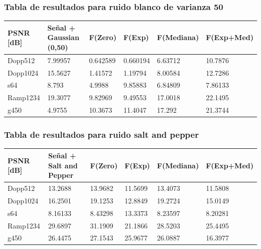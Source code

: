\subsubsection{Tabla de resultados para ruido blanco de varianza 50}

\begin{table}[H]
        \begin{tabular}{|l|lllll|}
                \hline
                \textbf{PSNR [dB]} & Se\~nal + Gaussian (0,50) & F(Zero) & F(Exp) & F(Mediana) & F(Exp+Med) \\ \hline
                    Dopp512 		& 7.99957				 & 0.642589 & 0.660194 & 6.63712 & 10.7876\\
                    Dopp1024 & 15.5627 							& 1.41572 & 1.19794 & 8.00584 &  12.7286   \\
                    s64 & 8.793 								& 4.9988 & 9.85883 &  6.84809  & 7.86133\\
                    Ramp1234	& 19.3077 						& 9.82969 & 9.49553 & 17.0018 & 22.1495 \\
                    g450 	& 4.9755 							& 10.3673 & 11.4047 & 17.292   &  21.3744\\ \hline
                    \end{tabular}
                \end{table}



\subsubsection{Tabla de resultados para ruido salt and pepper}

\begin{table}[H]
        \begin{tabular}{|l|lllll|}
                \hline
                \textbf{PSNR [dB]} & Se\~nal + Salt and Pepper  & F(Zero) & F(Exp) & F(Mediana) & F(Exp+Med) \\ \hline
                    Dopp512 		& 13.2688 					& 13.9682 & 11.5699 & 13.4073   & 11.5808 \\
                    Dopp1024 		& 16.2501 					& 19.1253 & 12.8849 & 19.2724  & 15.0149 \\
                    s64				 & 8.16133 					& 8.43298 & 13.3373 & 8.23597  &  8.20281\\
                    Ramp1234 		& 29.6897 					& 31.1909 & 21.1866 & 28.5203  & 25.4495\\
                    g450 			& 26.4475 					& 27.1543 & 25.9677 & 26.0887  &  16.3977\\ \hline
                    \end{tabular}
                \end{table}


